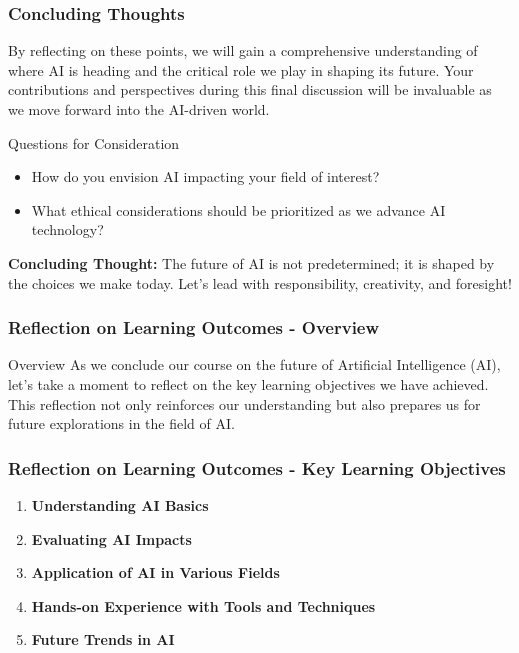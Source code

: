 \documentclass{beamer}
\begin{document}
\begin{frame}[fragile]
    \frametitle{Concluding Thoughts}
    By reflecting on these points, we will gain a comprehensive understanding of where AI is heading and the critical role we play in shaping its future. 
    Your contributions and perspectives during this final discussion will be invaluable as we move forward into the AI-driven world.

    \begin{block}{Questions for Consideration}
        \begin{itemize}
            \item How do you envision AI impacting your field of interest?
            \item What ethical considerations should be prioritized as we advance AI technology? 
        \end{itemize}
    \end{block}

    \textbf{Concluding Thought:} The future of AI is not predetermined; it is shaped by the choices we make today. Let’s lead with responsibility, creativity, and foresight!
\end{frame}

\begin{frame}
    \frametitle{Reflection on Learning Outcomes - Overview}
    \begin{block}{Overview}
        As we conclude our course on the future of Artificial Intelligence (AI), let's take a moment to reflect on the key learning objectives we have achieved. 
        This reflection not only reinforces our understanding but also prepares us for future explorations in the field of AI.
    \end{block}
\end{frame}

\begin{frame}
    \frametitle{Reflection on Learning Outcomes - Key Learning Objectives}
    \begin{enumerate}
        \item \textbf{Understanding AI Basics}
        \item \textbf{Evaluating AI Impacts}
        \item \textbf{Application of AI in Various Fields}
        \item \textbf{Hands-on Experience with Tools and Techniques}
        \item \textbf{Future Trends in AI}
    \end{enumerate}
\end{frame}
\end{document}
